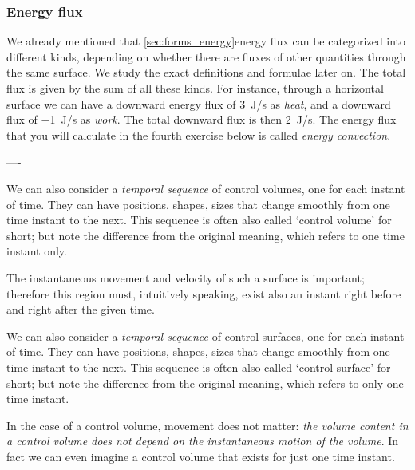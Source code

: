 \subsubsection{Energy flux}
\label{sec:energy_flux}
We already mentioned that \autoref{sec:forms_energy}{energy flux can be categorized into different kinds}, depending on whether there are fluxes of other quantities through the same surface. We study the exact definitions and formulae later on. The total flux is given by the sum of all these kinds. For instance, through a horizontal surface we can have a downward energy flux of \qty{3}{J/s} as \emph{heat}, and a downward flux of \qty{-1}{J/s} as \emph{work}. The total downward flux is then \qty{2}{J/s}. The energy flux that you will calculate in the fourth exercise below is called \emph{energy convection}.




----

  We can also consider a \emph{temporal sequence} of control volumes, one for each instant of time. They can have positions, shapes, sizes that change smoothly from one time instant to the next. This sequence is often also called \enquote*{control volume} for short; but note the difference from the original meaning, which refers to one time instant only.


  The instantaneous movement and velocity of such a surface is important; therefore this region must, intuitively speaking, exist also an instant right before and right after the given time.

  \smallskip

  We can also consider a \emph{temporal sequence} of control surfaces, one for each instant of time. They can have positions, shapes, sizes that change smoothly from one time instant to the next. This sequence is often also called \enquote*{control surface} for short; but note the difference from the original meaning, which refers to only one time instant.

In the case of a control volume, movement does not matter: \emph{the volume content in a control volume does not depend on the instantaneous motion of the volume}. In fact we can even imagine a control volume that exists for just one time instant.

